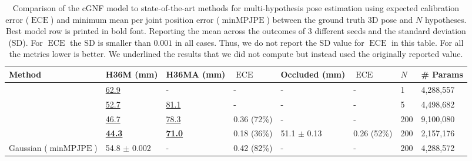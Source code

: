 \documentclass{article} \usepackage{iclr2023_conference,times}
\begin{document}
\begin{table}[h!]
  \def\arraystretch{1.25}
  \caption{Comparison of the cGNF model to state-of-the-art methods for multi-hypothesis pose estimation using expected calibration error ($\operatorname{ECE}$) and minimum mean per joint position error ($\operatorname{minMPJPE}$) between the ground truth 3D pose and $N$ hypotheses.
  Best model row is printed in bold font.
  Reporting the mean across the outcomes of 3 different seeds and the standard deviation (SD). For $\operatorname{ECE}$ the SD is smaller than $0.001$ in all cases. Thus, we do not report the SD value for $\operatorname{ECE}$ in this table.
  For all the metrics lower is better. We underlined the results that we did not compute but instead used the originally reported value.\\}
  \label{tab:h36m_results}
  \centering
  \scriptsize
\begin{tabular}{l|lll|ll|ll}
\toprule
Method                                        & H36M \tiny{(mm)}           & H36MA \tiny{(mm)}          & $\operatorname{ECE}$                & Occluded \tiny{(mm)}                      & $\operatorname{ECE}$                & $N$               & \# Params \\
\midrule
\citet{martinez_2017_3dbaseline} & \underline{62.9} & - & - &- &- &1&4,288,557\\
\midrule
\citet{Li_Hee_Lee_2019}                            & \underline{52.7}                      & \underline{81.1}                      & -                                & -                                       & -                               & 5                        & 4,498,682 \\
\citet{Sharma_Varigonda_Bindal_Sharma_Jain_2019} & \underline{46.7}                       & \underline{78.3}                       & 0.36 \tiny{(72\%)}                       & -                                       & -                               & 200                      & 9,100,080 \\
\citet{Wehrbein_Rudolph_Rosenhahn_Wandt_2021}     & \underline{\textbf{44.3}}                      & \underline{\textbf{71.0}}                    & 0.18 \tiny{(36\%)}                       & 51.1 \tiny{$\pm$ 0.13}                     & 0.26 \tiny{(52\%)}                      & 200                      & 2,157,176 \\ 
\midrule
Gaussian ($\operatorname{minMPJPE}$)       & 54.8 \tiny{$\pm$ 0.002}  & -       & 0.42 \tiny{(82\%)}  & -                  & -          & 200 & 4,288,572 \\

\end{tabular}
\end{table}
\end{document}

